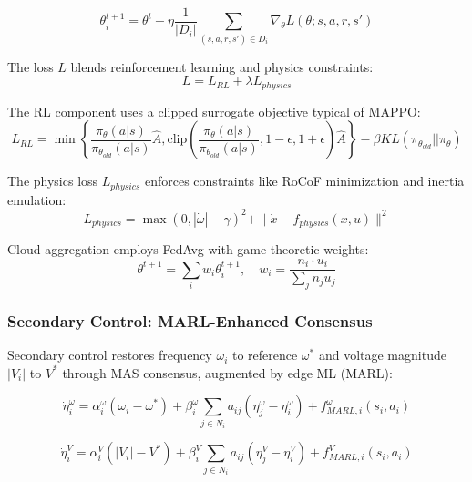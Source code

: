 \documentclass[12pt]{article}
\begin{document}
\begin{equation}
\theta_i^{t+1} = \theta^t - \eta \frac{1}{|D_i|} \sum_{(s,a,r,s') \in D_i} \nabla_\theta L(\theta; s, a, r, s')
\end{equation}

The loss $L$ blends reinforcement learning and physics constraints:
\begin{equation}
L = L_{RL} + \lambda L_{physics}
\end{equation}

The RL component uses a clipped surrogate objective typical of MAPPO:
\begin{equation}
L_{RL} = \min\left\{\frac{\pi_\theta(a|s)}{\pi_{\theta_{old}}(a|s)}\hat{A}, \text{clip}\left(\frac{\pi_\theta(a|s)}{\pi_{\theta_{old}}(a|s)}, 1-\epsilon, 1+\epsilon\right)\hat{A}\right\} - \beta KL(\pi_{\theta_{old}}||\pi_\theta)
\end{equation}

The physics loss $L_{physics}$ enforces constraints like RoCoF minimization and inertia emulation:
\begin{equation}
L_{physics} = \max(0, |\dot{\omega}| - \gamma)^2 + \|\dot{x} - f_{physics}(x, u)\|^2
\end{equation}

Cloud aggregation employs FedAvg with game-theoretic weights:
\begin{equation}
\theta^{t+1} = \sum_i w_i \theta_i^{t+1}, \quad w_i = \frac{n_i \cdot u_i}{\sum_j n_j u_j}
\end{equation}

\subsubsection{Secondary Control: MARL-Enhanced Consensus}

Secondary control restores frequency $\omega_i$ to reference $\omega^*$ and voltage magnitude $|V_i|$ to $V^*$ through MAS consensus, augmented by edge ML (MARL):

\begin{equation}
\dot{\eta}_i^\omega = \alpha_i^\omega(\omega_i - \omega^*) + \beta_i^\omega \sum_{j \in N_i} a_{ij}(\eta_j^\omega - \eta_i^\omega) + f_{MARL,i}^\omega(s_i, a_i)
\end{equation}

\begin{equation}
\dot{\eta}_i^V = \alpha_i^V(|V_i| - V^*) + \beta_i^V \sum_{j \in N_i} a_{ij}(\eta_j^V - \eta_i^V) + f_{MARL,i}^V(s_i, a_i)
\end{equation}
\end{document}
